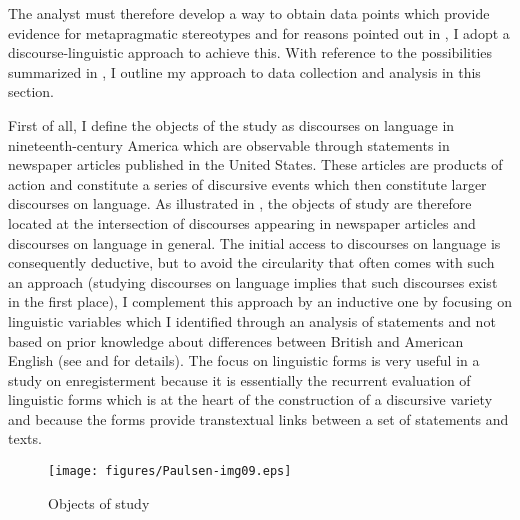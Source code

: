 The analyst must therefore develop a way to obtain data points which provide evidence for metapragmatic stereotypes and for reasons pointed out in , I adopt a discourse-linguistic approach to achieve this. With reference to the possibilities summarized in , I outline my approach to data collection and analysis in this section.


First of all, I define the objects of the study as discourses on language in nineteenth-century America which are observable through statements in newspaper articles published in the United States. These articles are products of action and constitute a series of discursive events which then constitute larger discourses on language. As illustrated in , the objects of study are therefore located at the intersection of discourses appearing in newspaper articles and discourses on language in general. The initial access to discourses on language is consequently deductive, but to avoid the circularity that often comes with such an approach (studying discourses on language implies that such discourses exist in the first place), I complement this approach by an inductive one by focusing on linguistic variables which I identified through an analysis of statements and not based on prior knowledge about differences between British and American English (see  and  for details). The focus on linguistic forms is very useful in a study on enregisterment because it is essentially the recurrent evaluation of linguistic forms which is at the heart of the construction of a discursive variety and because the forms provide transtextual links between a set of statements and texts.


\begin{figure}
\texttt{[image: figures/Paulsen-img09.eps]}
\caption{
Objects of study
}
\label{fig:key:9}
\end{figure}


